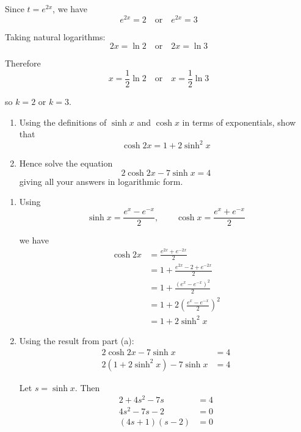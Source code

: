 \documentclass[leqno]{article}
\begin{document}
\begin{enumerate}[
  label=\textbf{\arabic*.},
  leftmargin=*,
  topsep=0pt,
  partopsep=0pt,
  parsep=0pt
]
\begin{djsSolution}
\begin{enumerate}[label=\textbf{(\alph*)}]
Since \(t=e^{2x}\), we have
\[
e^{2x}=2 \quad \text{or} \quad e^{2x}=3
\]

Taking natural logarithms:
\[
2x=\ln 2 \quad \text{or} \quad 2x=\ln 3
\]

Therefore
\[
x=\frac12\ln 2 \quad \text{or} \quad x=\frac12\ln 3
\]

so \(k=2\) or \(k=3\).

\end{enumerate}
\end{djsSolution}


\newpage

\questionitem

\begin{enumerate}[label=\textbf{(\alph*)}]
  \item Using the definitions of $\sinh x$ and $\cosh x$ in terms of exponentials, show that \[\cosh 2x = 1+2\sinh^2 x\]  
  \item Hence solve the equation \[2\cosh 2x-7\sinh x=4\] giving all your answers in logarithmic form.  \\
\end{enumerate}

\vspace*{10pt}

\begin{djsSolution}
\begin{enumerate}[label=\textbf{(\alph*)}]
  \item Using
\[
\sinh x=\frac{e^x-e^{-x}}{2},
\qquad
\cosh x=\frac{e^x+e^{-x}}{2}
\]

we have
\begin{align*}
\cosh 2x
&=\frac{e^{2x}+e^{-2x}}{2} \\
&=1+\frac{e^{2x}-2+e^{-2x}}{2} \\
&=1+\frac{(e^x-e^{-x})^2}{2} \\
&=1+2\left(\frac{e^x-e^{-x}}{2}\right)^2 \\
&=1+2\sinh^2 x
\end{align*}

  \item Using the result from part (a):
\begin{align*}
2\cosh 2x-7\sinh x&=4 \\
2(1+2\sinh^2 x)-7\sinh x&=4
\end{align*}

Let \(s=\sinh x\). Then
\begin{align*}
2+4s^2-7s&=4 \\
4s^2-7s-2&=0 \\
(4s+1)(s-2)&=0
\end{align*}


\end{enumerate}
\end{djsSolution}
\end{enumerate}
\end{document}
